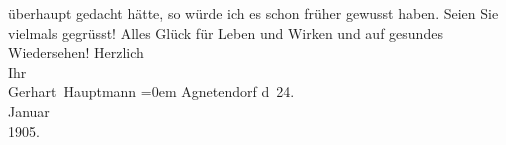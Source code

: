 \begin{ledgroupsized}[t]{13cm}
               überhaupt gedacht hätte, so würde ich es schon früher gewusst haben. Seien Sie
               vielmals gegrüsst! Alles Glück für Leben und Wirken und auf gesundes Wiedersehen!\pend
           \pstart
           Herzlich{\\[\baselineskip]} Ihr{\\[\baselineskip]}\spacefill\mbox{Gerhart Hauptmann}\pend
           \leftskip=0em{}\pstart
           \noindent{}{\pb}Agnetendorf\pend
           \pstart
           d 24.{\\}Januar{\\}1905.\pend
           
         
         \endnumbering{}\end{ledgroupsized}  \newcommand{\dateiname}{L01494}\newcommand{\titel}{Gerhart Hauptmann an Arthur Schnitzler, 24. 1. 1905}\newcommand{\editorInnen}{Martin Anton Müller und Gerd-Hermann Susen}
      